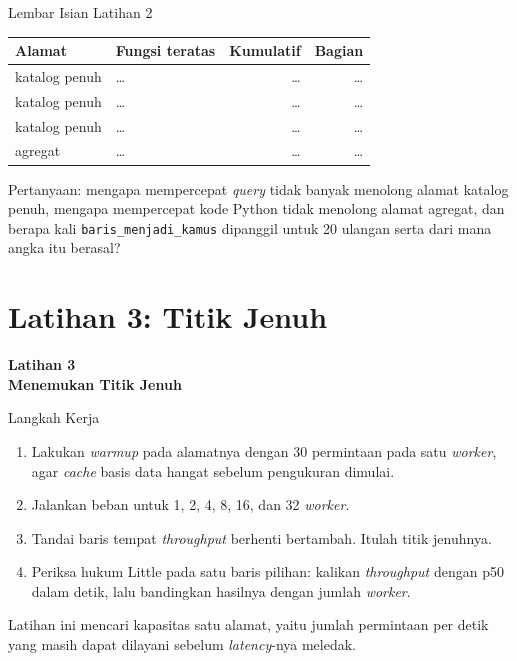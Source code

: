 \documentclass[aspectratio=169, table, 12pt]{beamer}
\begin{document}
\begin{frame}{{\Large Lembar Isian Latihan 2}}
  \vspace{4pt}
  \centering
  {\footnotesize
  \begin{tabularx}{\textwidth}{lYrr}
    \hline
    \textbf{Alamat} & \textbf{Fungsi teratas} & \textbf{Kumulatif} & \textbf{Bagian} \\
    \hline
    katalog penuh & \dots & \dots & \dots \\
    \hline
    katalog penuh & \dots & \dots & \dots \\
    \hline
    katalog penuh & \dots & \dots & \dots \\
    \hline
    agregat & \dots & \dots & \dots \\
    \hline
  \end{tabularx}}

  \vspace{6pt}
  {\footnotesize Pertanyaan: mengapa mempercepat \textit{query} tidak banyak menolong
  alamat katalog penuh, mengapa mempercepat kode Python tidak menolong alamat
  agregat, dan berapa kali \texttt{baris\_menjadi\_kamus} dipanggil untuk 20
  ulangan serta dari mana angka itu berasal?}
\end{frame}

\section{Latihan 3: Titik Jenuh}

\begin{frame}{\hfill}
  \centering
  \Huge{\textbf{Latihan 3\\Menemukan Titik Jenuh}}
\end{frame}

\begin{frame}{{\Large Langkah Kerja}}
  \vspace{6pt}
  \begin{enumerate}
    \item Lakukan \textit{warmup} pada alamatnya dengan 30 permintaan pada
          satu \textit{worker},
          agar \textit{cache} basis data hangat sebelum pengukuran dimulai.
    \item Jalankan beban untuk 1, 2, 4, 8, 16, dan 32 \textit{worker}.
    \item Tandai baris tempat \textit{throughput} berhenti bertambah. Itulah
          titik jenuhnya.
    \item Periksa hukum Little pada satu baris pilihan: kalikan
          \textit{throughput} dengan p50 dalam detik, lalu bandingkan
          hasilnya dengan jumlah \textit{worker}.
  \end{enumerate}
  \vspace{4pt}
  {\footnotesize Latihan ini mencari kapasitas satu alamat, yaitu jumlah
  permintaan per detik yang masih dapat dilayani sebelum \textit{latency}-nya meledak.}
\end{frame}
\end{document}
